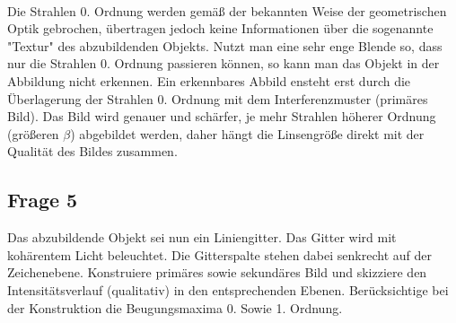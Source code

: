 \documentclass[a4paper,10pt]{scrartcl}
\begin{document}
			\\
			Die Strahlen 0. Ordnung werden gemäß der bekannten Weise der geometrischen Optik gebrochen, übertragen jedoch keine Informationen über die sogenannte "Textur" des abzubildenden Objekts. Nutzt man eine sehr enge Blende so, dass nur die Strahlen 0. Ordnung passieren können, so kann man das Objekt in der Abbildung nicht erkennen. Ein erkennbares Abbild ensteht erst durch die Überlagerung der Strahlen 0. Ordnung mit dem Interferenzmuster (primäres Bild). Das Bild wird genauer und schärfer, je mehr Strahlen höherer Ordnung 
			(größeren \(\beta\)) abgebildet werden, daher hängt die Linsengröße direkt mit der Qualität des Bildes zusammen.
			
			\subsection{Frage 5}
		Das abzubildende Objekt sei nun ein Liniengitter. Das Gitter wird mit kohärentem Licht beleuchtet. Die Gitterspalte stehen dabei senkrecht auf der Zeichenebene. Konstruiere primäres sowie sekundäres Bild und skizziere den Intensitätsverlauf (qualitativ) in den entsprechenden Ebenen. Berücksichtige bei der Konstruktion die Beugungsmaxima 0. Sowie 1. Ordnung.
					
\end{document}
